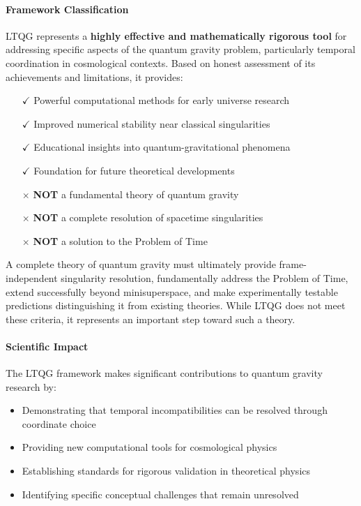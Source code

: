 \paragraph{Framework Classification}
LTQG represents a \textbf{highly effective and mathematically rigorous tool} for addressing specific aspects of the quantum gravity problem, particularly temporal coordination in cosmological contexts. Based on honest assessment of its achievements and limitations, it provides:
\begin{itemize}
\item[$\checkmark$] Powerful computational methods for early universe research  
\item[$\checkmark$] Improved numerical stability near classical singularities
\item[$\checkmark$] Educational insights into quantum-gravitational phenomena
\item[$\checkmark$] Foundation for future theoretical developments
\item[$\times$] \textbf{NOT} a fundamental theory of quantum gravity
\item[$\times$] \textbf{NOT} a complete resolution of spacetime singularities
\item[$\times$] \textbf{NOT} a solution to the Problem of Time
\end{itemize}

A complete theory of quantum gravity must ultimately provide frame-independent singularity resolution, fundamentally address the Problem of Time, extend successfully beyond minisuperspace, and make experimentally testable predictions distinguishing it from existing theories. While LTQG does not meet these criteria, it represents an important step toward such a theory.

\paragraph{Scientific Impact}
The LTQG framework makes significant contributions to quantum gravity research by:
\begin{itemize}
\item Demonstrating that temporal incompatibilities can be resolved through coordinate choice
\item Providing new computational tools for cosmological physics
\item Establishing standards for rigorous validation in theoretical physics
\item Identifying specific conceptual challenges that remain unresolved
\end{itemize}

